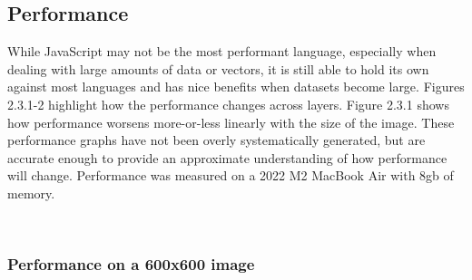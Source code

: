 \documentclass{article}
\begin{document}
\begin{multicols}{2}
\subsection{Performance}

While JavaScript may not be the most performant language, especially when dealing with large amounts of data or vectors, it is still able to hold its own against most languages and has nice benefits when datasets become large. Figures 2.3.1-2 highlight how the performance changes across layers. Figure 2.3.1 shows how performance worsens more-or-less linearly with the size of the image. These performance graphs have not been overly systematically generated, but are accurate enough to provide an approximate understanding of how performance will change. Performance was measured on a 2022 M2 MacBook Air with 8gb of memory.

\

\subsubsection{Performance on a 600x600 image}

\sixhundred

\noindent
{}
\end{multicols}
\end{document}
